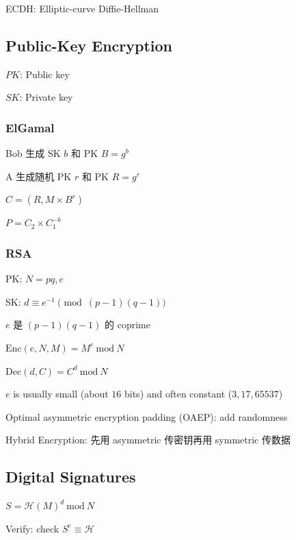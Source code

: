 \documentclass[9pt,landscape]{article}
\begin{document}
\begin{multicols}{2}
ECDH: Elliptic-curve Diffie-Hellman

\subsection{Public-Key Encryption}

$PK$: Public key

$SK$: Private key

\subsubsection{ElGamal}

Bob 生成 SK $b$ 和 PK $B=g^b$

A 生成随机 PK $r$ 和 PK $R=g^r$

$C = (R, M\times B^r)$

$P = C_2\times C_1^{-b}$

\subsubsection{RSA}

PK: $N = pq, e$

SK: $d \equiv e^{-1}\pmod{(p-1)(q-1)}$

$e$ 是 $(p-1)(q-1)$ 的 coprime

$\mathrm{Enc}(e, N, M) = M^e \mathrm{\ mod\ }N$

$\mathrm{Dec}(d, C) = C^d\mathrm{\ mod\ }N$

$e$ is usually small (about $16$ bits) and often constant ($3, 17, 65537$)

Optimal asymmetric encryption padding (OAEP): add randomness

Hybrid Encryption: 先用 asymmetric 传密钥再用 symmetric 传数据

\subsection{Digital Signatures}

$S = {\mathcal{H}(M)}^d\mathrm{\ mod\ }N$

Verify: check $S^e\equiv\mathcal{H}$

\end{multicols}
\end{document}
